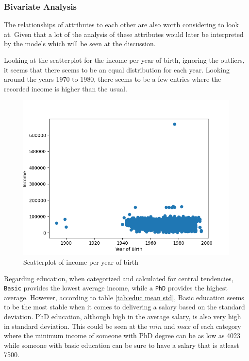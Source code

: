
\subsubsection{Bivariate Analysis}

The relationships of attributes to each other are also worth considering to look at. Given that a lot of the analysis of these attributes would later be interpreted by the models which will be seen at the discussion.

Looking at the scatterplot for the income per year of birth, ignoring the outliers, it seems that there seems to be an equal distribution for each year. Looking around the years 1970 to 1980, there seems to be a few entries where the recorded income is higher than the usual. 

\begin{figure}[H]
    \centering
    \includegraphics[width=\linewidth]{figures/income_per_yob.png}
    \caption{Scatterplot of income per year of birth}
\end{figure}

Regarding education, when categorized and calculated for central tendencies, \texttt{Basic} provides the lowest average income, while a \texttt{PhD} provides the highest average. However, according to table \ref{tab:educ mean std}, Basic education seems to be the most stable when it comes to delivering a salary based on the standard deviation. PhD education, although high in the average salary, is also very high in standard deviation. This could be seen at the $min$ and $max$ of each category where the minimum income of someone with PhD degree can be as low as 4023 while someone with basic education can be sure to have a salary that is atleast 7500.

